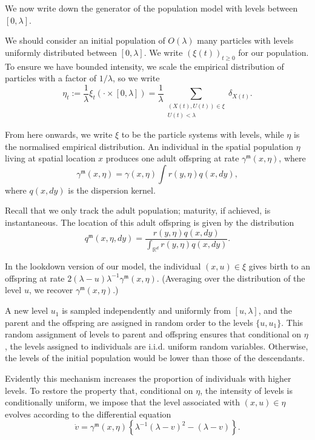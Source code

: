 \documentclass[12pt]{article}
\begin{document}
We now write down the generator of
the population model with levels between $[0, \lambda]$.

We should consider an initial population of $O(\lambda)$ many particles with levels
uniformly distributed between $[0, \lambda]$.
We write $(\xi(t))_{t \geq 0}$
for our population.
To ensure we have bounded intensity, 
we scale the empirical distribution of particles with a factor of $1/\lambda$,
so we write
$$\eta_t:=\frac{1}{\lambda}\xi_t(\cdot \times [0,\lambda])=
\frac{1}{\lambda}\sum\limits_{\substack{(X(t),U(t))\in \xi \\ U(t) < \lambda}} \delta_{X(t)}.$$ 

From here onwards,
we write $\xi$ to be the particle systems with levels,
while $\eta$ is the normalised empirical distribution.
An individual in the spatial population $\eta$ living at spatial location $x$
produces one adult offspring at rate $\gamma^{\mathfrak{m}}(x, \eta)$, where
$$\gamma^{\mathfrak{m}}(x,\eta)=\gamma(x,\eta) \int r (y, \eta)q(x,dy),$$
where $q(x,dy)$ is the dispersion kernel.

Recall that we only track the adult population; maturity, if achieved, is instantaneous.
The location of this adult offspring is given by
the distribution 
\[ q^{\mathfrak{m}}(x,\eta,dy) = \frac{r(y,\eta) q(x,dy)}{\int_{\mathbb{R}^d} r(y,\eta) q(x,dy)}. \]

In the lookdown version of our model,
the individual $(x,u)\in \xi$
gives birth to an offspring at rate 
$2(\lambda-u)\lambda^{-1} \gamma^{\mathfrak{m}}(x, \eta)$. 
(Averaging over the distribution of the
level $u$,
we recover $\gamma^{\mathfrak{m}}(x, \eta)$.)

A new level $u_1$ is sampled independently and
uniformly from $[u,\lambda]$,
and the parent and the offspring are assigned in random order to the  levels $\{u, u_1\}$.
This random assignment of levels to parent
and offspring ensures that conditional on $\eta$,
the levels assigned to individuals are i.i.d.
uniform random variables.
Otherwise, the levels of the initial population would be lower than those of the descendants.

Evidently this mechanism increases the proportion
of individuals with higher levels.
To restore the property that,
conditional on $\eta$,
the intensity of levels is conditionally uniform,
we impose that 
the level associated with $(x,u)\in\eta$
evolves according to the differential equation
$$\dot{v}=  \gamma^{\mathfrak{m}}(x, \eta) 
\left\{\lambda^{-1}(\lambda -v)^{2}
-(\lambda -v)\right\}.$$
\end{document}
